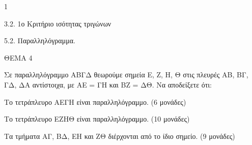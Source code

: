 \begin{ylh}{1}
    \item 3.2. 1ο Κριτήριο ισότητας τριγώνων
    \item 5.2. Παραλληλόγραμμα.
\end{ylh}

ΘΕΜΑ 4

Σε παραλληλόγραμμο ΑΒΓΔ θεωρούμε σημεία Ε, Ζ, Η, Θ στις πλευρές ΑΒ, ΒΓ, ΓΔ, ΔΑ αντίστοιχα, με ΑΕ = ΓΗ και ΒΖ = ΔΘ. Να αποδείξετε ότι:

\begin{alist}
\item Το τετράπλευρο ΑΕΓΗ είναι παραλληλόγραμμο. (6 μονάδες)

\item Το τετράπλευρο ΕΖΗΘ είναι παραλληλόγραμμο. (10 μονάδες)

\item Τα τμήματα ΑΓ, ΒΔ, ΕΗ και ΖΘ διέρχονται από το ίδιο σημείο. (9 μονάδες)


\end{alist}
